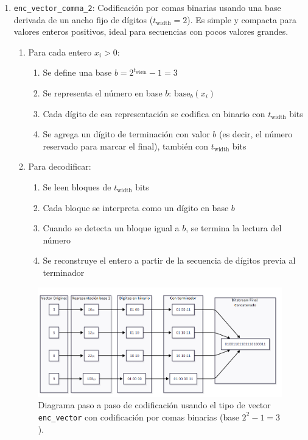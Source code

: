 \begin{enumerate}
  \item \texttt{enc\_vector\_comma\_2}:  
        Codificación por comas binarias usando una base derivada de un ancho fijo de dígitos (\(t_{\text{width}} = 2\)). Es simple y compacta para valores enteros positivos, ideal para secuencias con pocos valores grandes.
        
        \begin{enumerate}
            \item Para cada entero \(x_i > 0\):
            \begin{enumerate}
                \item Se define una base \(b = 2^{t_{\text{width}}} - 1 = 3\)
                \item Se representa el número en base \(b\): \(\text{base}_b(x_i)\)
                \item Cada dígito de esa representación se codifica en binario con \(t_{\text{width}}\) bits
                \item Se agrega un dígito de terminación con valor \(b\) (es decir, el número reservado para marcar el final), también con \(t_{\text{width}}\) bits
            \end{enumerate}
            \item Para decodificar:
            \begin{enumerate}
                \item Se leen bloques de \(t_{\text{width}}\) bits
                \item Cada bloque se interpreta como un dígito en base \(b\)
                \item Cuando se detecta un bloque igual a \(b\), se termina la lectura del número
                \item Se reconstruye el entero a partir de la secuencia de dígitos previa al terminador
            \end{enumerate}
        \end{enumerate}
        
        \begin{figure}
            \centering
            \includegraphics[width=0.9\linewidth]{alternatives/images/enc_vector_comma.png}
            \caption[Ejemplo \texttt{enc\_vector\_comma\_2}]{Diagrama paso a paso de codificación usando el tipo de vector \texttt{enc\_vector} con codificación por comas binarias (base \(2^2 - 1 = 3\)).}
            \label{enc_vector_comma_2}
        \end{figure}
        

\end{enumerate}
